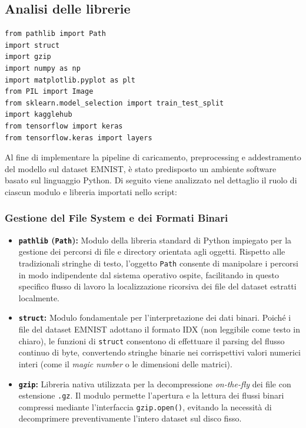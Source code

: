 \documentclass[12pt,a4paper]{article}
\begin{document}
	\subsection{Analisi delle librerie}
	\begin{lstlisting}[style=vscode-esatto, caption={Importazione delle librerie per il Machine Learning}]
from pathlib import Path
import struct
import gzip
import numpy as np
import matplotlib.pyplot as plt
from PIL import Image
from sklearn.model_selection import train_test_split
import kagglehub
from tensorflow import keras
from tensorflow.keras import layers
	\end{lstlisting}

	Al fine di implementare la pipeline di caricamento, preprocessing e addestramento del modello sul dataset EMNIST, è stato predisposto un ambiente software basato sul linguaggio Python. Di seguito viene analizzato nel dettaglio il ruolo di ciascun modulo e libreria importati nello script:

	\subsubsection{Gestione del File System e dei Formati Binari}
	\begin{itemize}
		\item \textbf{\texttt{pathlib} (\texttt{Path}):} Modulo della libreria standard di Python impiegato per la gestione dei percorsi di file e directory orientata agli oggetti. Rispetto alle tradizionali stringhe di testo, l'oggetto \texttt{Path} consente di manipolare i percorsi in modo indipendente dal sistema operativo ospite, facilitando in questo specifico flusso di lavoro la localizzazione ricorsiva dei file del dataset estratti localmente.
		\item \textbf{\texttt{struct}:} Modulo fondamentale per l'interpretazione dei dati binari. Poiché i file del dataset EMNIST adottano il formato IDX (non leggibile come testo in chiaro), le funzioni di \texttt{struct} consentono di effettuare il parsing del flusso continuo di byte, convertendo stringhe binarie nei corrispettivi valori numerici interi (come il \textit{magic number} o le dimensioni delle matrici).
		\item \textbf{\texttt{gzip}:} Libreria nativa utilizzata per la decompressione \textit{on-the-fly} dei file con estensione \texttt{.gz}. Il modulo permette l'apertura e la lettura dei flussi binari compressi mediante l'interfaccia \texttt{gzip.open()}, evitando la necessità di decomprimere preventivamente l'intero dataset sul disco fisso.
	\end{itemize}
\end{document}
